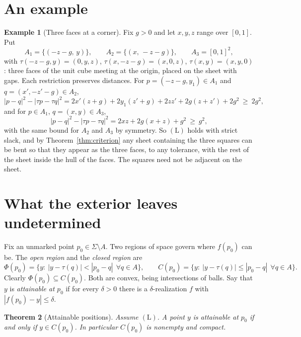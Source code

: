 \documentclass[11pt]{article}
\newtheorem{theorem}{Theorem}
\theoremstyle{definition}
\newtheorem{example}[theorem]{Example}
\theoremstyle{remark}
\begin{document}
\section{An example}

\begin{example}[Three faces at a corner]\label{ex:corner}
Fix $g>0$ and let $x,y,z$ range over $[0,1]$. Put
\[
A_1=\{(-z-g,\,y)\},\qquad A_2=\{(x,\,-z-g)\},\qquad A_3=[0,1]^2,
\]
with $\tau(-z-g,y)=(0,y,z)$, $\tau(x,-z-g)=(x,0,z)$, $\tau(x,y)=(x,y,0)$: three faces of the unit cube meeting at the origin, placed on the sheet with gaps. Each restriction preserves distances. For $p=(-z-g,y_1)\in A_1$ and $q=(x',-z'-g)\in A_2$,
\[
|p-q|^2-|\tau p-\tau q|^2=2x'(z+g)+2y_1(z'+g)+2zz'+2g(z+z')+2g^2\ \ge\ 2g^2,
\]
and for $p\in A_1$, $q=(x,y)\in A_3$,
\[
|p-q|^2-|\tau p-\tau q|^2=2xz+2g(x+z)+g^2\ \ge\ g^2,
\]
with the same bound for $A_2$ and $A_3$ by symmetry. So $(\mathrm L)$ holds with strict slack, and by Theorem~\ref{thm:criterion} any sheet containing the three squares can be bent so that they appear as the three faces, to any tolerance, with the rest of the sheet inside the hull of the faces. The squares need not be adjacent on the sheet.
\end{example}

\section{What the exterior leaves undetermined}

Fix an unmarked point $p_0\in\Sigma\setminus A$. Two regions of space govern where $f(p_0)$ can be. The \emph{open region} and the \emph{closed region} are
\[
\Phi(p_0)=\{y:\ |y-\tau(q)|<|p_0-q|\ \ \forall q\in A\},\qquad
C(p_0)=\{y:\ |y-\tau(q)|\le|p_0-q|\ \ \forall q\in A\}.
\]
Clearly $\Phi(p_0)\subseteq C(p_0)$. Both are convex, being intersections of balls. Say that $y$ is \emph{attainable at $p_0$} if for every $\delta>0$ there is a $\delta$-realization $f$ with $|f(p_0)-y|\le\delta$.

\begin{theorem}[Attainable positions]\label{thm:attain}
Assume $(\mathrm L)$. A point $y$ is attainable at $p_0$ if and only if $y\in C(p_0)$. In particular $C(p_0)$ is nonempty and compact.
\end{theorem}
\end{document}
